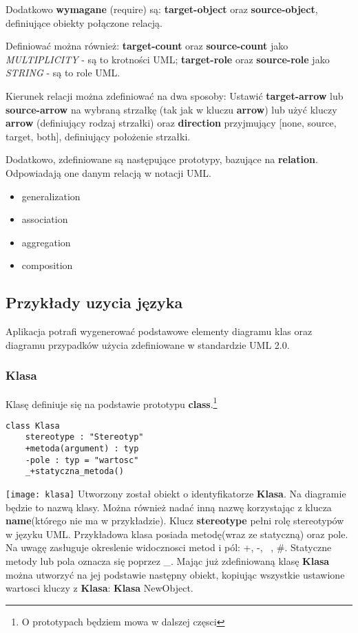 Dodatkowo \textbf{wymagane} (require) są: \textbf{target-object} oraz \textbf{source-object}, definiujące obiekty połączone relacją.

Definiować można również: \textbf{target-count} oraz \textbf{source-count} jako \emph{MULTIPLICITY} - są to krotności UML; \textbf{target-role} oraz \textbf{source-role} jako \emph{STRING} - są to role UML.

Kierunek relacji można zdefiniować na dwa sposoby: Ustawić \textbf{target-arrow} lub \textbf{source-arrow} na wybraną strzałkę (tak jak w kluczu \textbf{arrow}) lub użyć kluczy \textbf{arrow} (definiujący rodzaj strzałki) oraz \textbf{direction} przyjmujący [none, source, target, both], definiujący położenie strzałki.

Dodatkowo, zdefiniowane są następujące prototypy, bazujące na \textbf{relation}. Odpowiadają one danym relacją w notacji UML.
\begin{itemize}
	\item generalization
	\item association
	\item aggregation
	\item composition
\end{itemize}


\subsection{Przykłady uzycia języka}

Aplikacja potrafi wygenerować podstawowe elementy diagramu klas oraz diagramu przypadków użycia zdefiniowane w standardzie UML 2.0.

\subsubsection{Klasa}

Klasę definiuje się na podstawie prototypu \textbf{class}.\footnote{O prototypach będziem mowa w dalszej częsci}

\begin{lstlisting}
class Klasa
    stereotype : "Stereotyp"
    +metoda(argument) : typ
    -pole : typ = "wartosc"
    _+statyczna_metoda()
\end{lstlisting}
\texttt{[image: klasa]}
Utworzony został obiekt o identyfikatorze \textbf{Klasa}. Na diagramie będzie to nazwą klasy. Można również nadać inną nazwę korzystając z klucza \textbf{name}(którego nie ma w przykładzie). Klucz \textbf{stereotype} pełni rolę stereotypów w języku UML. Przykładowa klasa posiada metodę(wraz ze statyczną) oraz pole. Na uwagę zasługuje okreslenie widocznosci metod i pól: +, -, ~, \#. Statyczne metody lub pola oznacza się poprzez \_.
Mając już zdefiniowaną klasę \textbf{Klasa} można utworzyć na jej podstawie następny obiekt, kopiując wszystkie ustawione wartosci kluczy z \textbf{Klasa}: \textbf{Klasa} NewObject.

